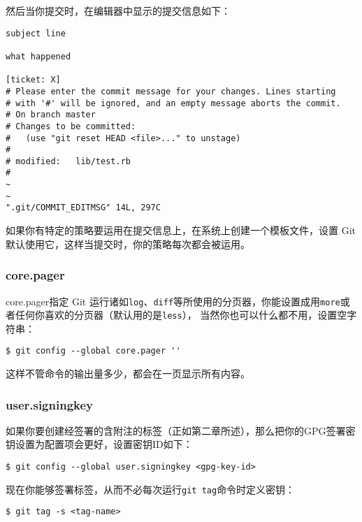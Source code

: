 \documentclass[a4paper]{book}
\begin{document}
然后当你提交时，在编辑器中显示的提交信息如下：

\begin{shaded}\begin{verbatim}
subject line

what happened

[ticket: X]
# Please enter the commit message for your changes. Lines starting
# with '#' will be ignored, and an empty message aborts the commit.
# On branch master
# Changes to be committed:
#   (use "git reset HEAD <file>..." to unstage)
#
# modified:   lib/test.rb
#
~
~
".git/COMMIT_EDITMSG" 14L, 297C
\end{verbatim}\end{shaded}

如果你有特定的策略要运用在提交信息上，在系统上创建一个模板文件，设置 Git 默认使用它，这样当提交时，你的策略每次都会被运用。

\subsubsection{core.pager}

core.pager指定 Git 运行诸如\texttt{log}、\texttt{diff}等所使用的分页器，你能设置成用\texttt{more}或者任何你喜欢的分页器（默认用的是\texttt{less}）， 当然你也可以什么都不用，设置空字符串：

\begin{shaded}\begin{verbatim}
$ git config --global core.pager ''
\end{verbatim}\end{shaded}

这样不管命令的输出量多少，都会在一页显示所有内容。

\subsubsection{user.signingkey}

如果你要创建经签署的含附注的标签（正如第二章所述），那么把你的GPG签署密钥设置为配置项会更好，设置密钥ID如下：

\begin{shaded}\begin{verbatim}
$ git config --global user.signingkey <gpg-key-id>
\end{verbatim}\end{shaded}

现在你能够签署标签，从而不必每次运行\texttt{git tag}命令时定义密钥：

\begin{shaded}\begin{verbatim}
$ git tag -s <tag-name>
\end{verbatim}\end{shaded}
\end{document}
